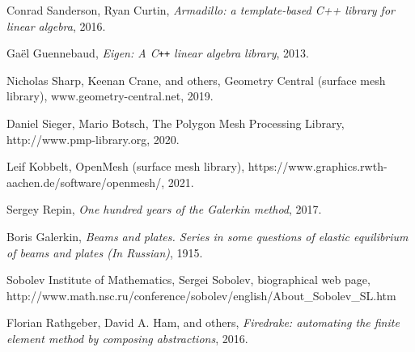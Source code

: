 \documentclass[11pt,a4paper]{memoir}
\begin{document}
\begin{thebibliography}{9}
Conrad Sanderson, Ryan Curtin,
\textit{Armadillo: a template-based C++ library for linear algebra},
2016.

Ga\"el Guennebaud,
\textit{Eigen: A C\texttt{++} linear algebra library},
2013.

Nicholas Sharp, Keenan Crane, and others,
Geometry Central (surface mesh library), www.geometry-central.net,
2019.

Daniel Sieger, Mario Botsch,
The Polygon Mesh Processing Library,
http://www.pmp-library.org,
2020.

Leif Kobbelt,
OpenMesh (surface mesh library),
https://www.graphics.rwth-aachen.de/software/openmesh/,
2021.

Sergey Repin,
\textit{One hundred  years of the Galerkin method},
2017.

Boris Galerkin,
\textit{Beams and plates. Series in some questions of elastic equilibrium of beams and plates (In Russian)},
1915.

Sobolev Institute of Mathematics,
Sergei Sobolev, biographical web page,
http://www.math.nsc.ru/conference/sobolev/english/About\_Sobolev\_SL.htm

Florian Rathgeber, David A. Ham, and others,
\textit{Firedrake: automating the finite element method by composing abstractions},
2016.


\end{thebibliography}
\end{document}
